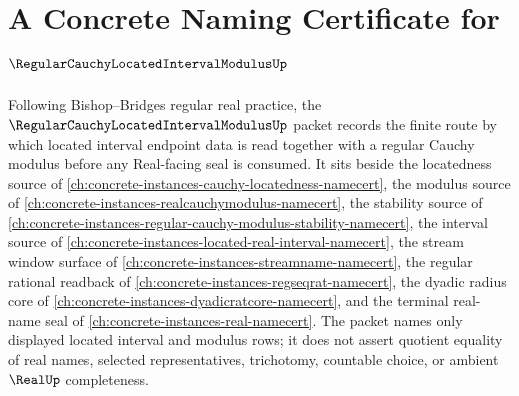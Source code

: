 \chapter{A Concrete Naming Certificate for $\RegularCauchyLocatedIntervalModulusUp$}
\label{ch:concrete-instances-regular-cauchy-located-interval-modulus-namecert}

Following Bishop--Bridges regular real practice, the $\RegularCauchyLocatedIntervalModulusUp$ packet records the finite route by which located interval endpoint data is read together with a regular Cauchy modulus before any Real-facing seal is consumed. It sits beside the locatedness source of \autoref{ch:concrete-instances-cauchy-locatedness-namecert}, the modulus source of \autoref{ch:concrete-instances-realcauchymodulus-namecert}, the stability source of \autoref{ch:concrete-instances-regular-cauchy-modulus-stability-namecert}, the interval source of \autoref{ch:concrete-instances-located-real-interval-namecert}, the stream window surface of \autoref{ch:concrete-instances-streamname-namecert}, the regular rational readback of \autoref{ch:concrete-instances-regseqrat-namecert}, the dyadic radius core of \autoref{ch:concrete-instances-dyadicratcore-namecert}, and the terminal real-name seal of \autoref{ch:concrete-instances-real-namecert}. The packet names only displayed located interval and modulus rows; it does not assert quotient equality of real names, selected representatives, trichotomy, countable choice, or ambient $\RealUp$ completeness.

